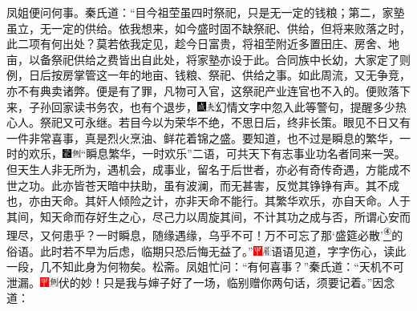 凤姐便问何事。秦氏道：``目今祖茔虽四时祭祀，只是无一定的钱粮；第二，家塾虽立，无一定的供给。依我想来，如今盛时固不缺祭祀、供给，但将来败落之时，此二项有何出处？莫若依我定见，趁今日富贵，将祖茔附近多置田庄、房舍、地亩，以备祭祀供给之费皆出自此处，将家塾亦设于此。合同族中长幼，大家定了则例，日后按房掌管这一年的地亩、钱粮、祭祀、供给之事。如此周流，又无争竞，亦不有典卖诸弊。便是有了罪，凡物可入官，这祭祀产业连官也不入的。便败落下来，子孙回家读书务农，也有个退步，{\includegraphics[width=3mm]{../Images/00005}\includegraphics[width=3mm]{../Images/00012}\footnotesize \kaishu 幻情文字中忽入此等警句，提醒多少热心人。}祭祀又可永继。若目今以为荣华不绝，不思日后，终非长策。眼见不日又有一件非常喜事，真是烈火烹油、鲜花着锦之盛。要知道，也不过是瞬息的繁华，一时的欢乐，{\includegraphics[width=3mm]{../Images/00006}\includegraphics[width=3mm]{../Images/00011}\footnotesize \kaishu ``瞬息繁华，一时欢乐''二语，可共天下有志事业功名者同来一哭。但天生人非无所为，遇机会，成事业，留名于后世者，亦必有奇传奇遇，方能成不世之功。此亦皆苍天暗中扶助，虽有波澜，而无甚害，反觉其铮铮有声。其不成也，亦由天命。其奸人倾险之计，亦非天命不能行。其繁华欢乐，亦自天命。人于其间，知天命而存好生之心，尽己力以周旋其间，不计其功之成与否，所谓心安而理尽，又何患乎？一时瞬息，随缘遇缘，乌乎不可！}万不可忘了那`盛筵必散'\href{../Text/part0017_split_000.html\#lnkback_4_a}{\textsuperscript{④}}的俗语。此时若不早为后虑，临期只恐后悔无益了。''{\includegraphics[width=3mm]{../Images/00002}\includegraphics[width=3mm]{../Images/00010}\footnotesize \kaishu 语语见道，字字伤心，读此一段，几不知此身为何物矣。松斋。}凤姐忙问：``有何喜事？''秦氏道：``天机不可泄漏。{\includegraphics[width=3mm]{../Images/00002}\includegraphics[width=3mm]{../Images/00011}\footnotesize \kaishu 伏的妙！}只是我与婶子好了一场，临别赠你两句话，须要记着。''因念道：

